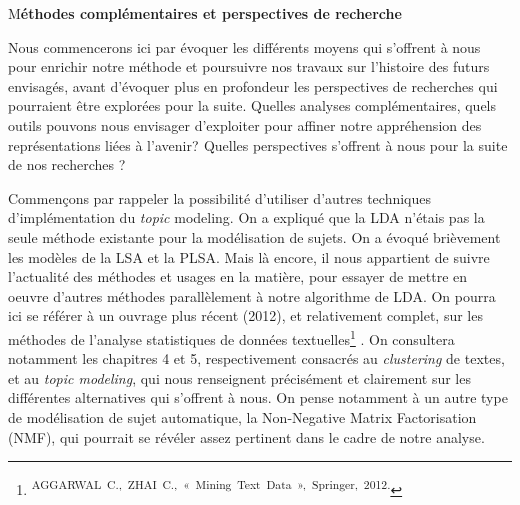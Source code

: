 \documentclass[letterpaper,portrait,12pt]{article}
\begin{document}
	M\textbf{\'{e}thodes compl\'{e}mentaires et perspectives de recherche}





\textcolor[rgb]{0.000,0.000,0.000}{	Nous commencerons ici par \'{e}voquer les diff\'{e}rents moyens qui s'offrent \`{a} nous pour enrichir notre m\'{e}thode et poursuivre nos travaux sur l'histoire des futurs envisag\'{e}s, avant d'\'{e}voquer plus en profondeur les perspectives de recherches qui pourraient \^{e}tre explor\'{e}es pour la suite. Quelles analyses compl\'{e}mentaires, quels outils pouvons nous envisager d'exploiter pour affiner notre appr\'{e}hension des repr\'{e}sentations li\'{e}es \`{a} l'avenir?}\textbf{\textcolor[rgb]{0.000,0.000,0.000}{ }}\textcolor[rgb]{0.000,0.000,0.000}{Quelles perspectives s'offrent \`{a} nous pour la suite de nos recherches ?}





	Commen\c{c}ons par rappeler la possibilit\'{e} d'utiliser d'autres techniques d'impl\'{e}mentation du \emph{topic }modeling. On a expliqu\'{e} que la LDA n'\'{e}tais pas la seule m\'{e}thode existante pour la mod\'{e}lisation de sujets. On a \'{e}voqu\'{e} bri\`{e}vement les mod\`{e}les de la LSA et la PLSA. Mais l\`{a} encore, il nous appartient de suivre l'actualit\'{e} des m\'{e}thodes et usages en la mati\`{e}re, pour essayer de mettre en oeuvre d'autres m\'{e}thodes parall\`{e}lement \`{a} notre algorithme de LDA. On pourra ici se r\'{e}f\'{e}rer \`{a} un ouvrage plus r\'{e}cent (2012), et relativement complet, sur les m\'{e}thodes de l'analyse statistiques de donn\'{e}es textuelles\footnote{\textsuperscript{\newpage
}\textsuperscript{	AGGARWAL\ C.,\ ZHAI\ C.,\ «\ Mining\ Text\ Data\ »,\ Springer,\ 2012.}} . On consultera notamment les chapitres 4 et 5, respectivement consacr\'{e}s au \emph{clustering} de textes, et au \emph{topic modeling}, qui nous renseignent pr\'{e}cis\'{e}ment et clairement sur les diff\'{e}rentes alternatives qui s'offrent \`{a} nous. On pense notamment \`{a} un autre type de mod\'{e}lisation de sujet automatique, la Non-Negative Matrix Factorisation (NMF), qui pourrait se r\'{e}v\'{e}ler assez pertinent dans le cadre de notre analyse.
\end{document}
